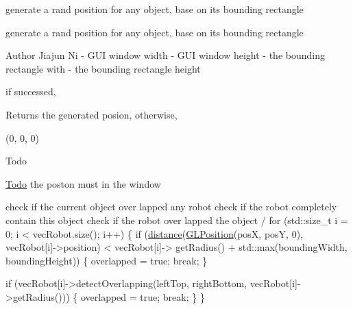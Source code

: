 generate a rand position for any object, base on its bounding rectangle 

generate a rand position for any object, base on its bounding rectangle

\begin{DoxyAuthor}{Author}
Jiajun Ni  -\/ G\-U\-I window width  -\/ G\-U\-I window height  -\/ the bounding rectangle with  -\/ the bounding rectangle height
\end{DoxyAuthor}
if successed, \begin{DoxyReturn}{Returns}
the generated posion, otherwise, 

(0, 0, 0) 
\end{DoxyReturn}
\begin{DoxyRefDesc}{Todo}
\item[\hyperlink{todo__todo000004}{Todo}]the poston must in the window \end{DoxyRefDesc}



\begin{DoxyCode}
   check \textcolor{keywordflow}{if} the current \textcolor{keywordtype}{object} over lapped any robot
   check \textcolor{keywordflow}{if} the robot completely contain \textcolor{keyword}{this} \textcolor{keywordtype}{object}
   check \textcolor{keywordflow}{if} the robot over lapped the \textcolor{keywordtype}{object}
  /  
\textcolor{keywordflow}{for} (std::size\_t i = 0; i < vecRobot.size(); i++)
\{
    \textcolor{keywordflow}{if} (\hyperlink{classEnvironmentClass_a3fa1b87f8ae74bf1cefda9862e1bdfca}{distance}(\hyperlink{structGLPosition}{GLPosition}(posX, posY, 0), vecRobot[i]->position) < vecRobot[i]->
      getRadius() + std::max(boundingWidth,
            boundingHeight))
    \{
        overlapped = \textcolor{keyword}{true};
        \textcolor{keywordflow}{break};
    \}
    
    \textcolor{keywordflow}{if} (vecRobot[i]->detectOverlapping(leftTop, rightBottom, vecRobot[i]->getRadius()))
    \{
        overlapped = \textcolor{keyword}{true};
        \textcolor{keywordflow}{break};
    \}
\}
\end{DoxyCode}




